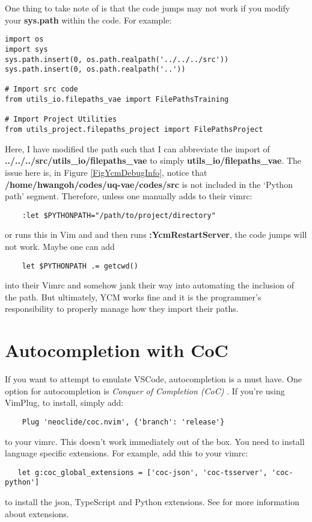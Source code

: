 One thing to take note of is that the code jumps may not work if you modify your
\textbf{sys.path} within the code. For example:
\begin{lstlisting}
import os
import sys
sys.path.insert(0, os.path.realpath('../../../src'))
sys.path.insert(0, os.path.realpath('..'))

# Import src code
from utils_io.filepaths_vae import FilePathsTraining

# Import Project Utilities
from utils_project.filepaths_project import FilePathsProject
\end{lstlisting}
Here, I have modified the path such that I can abbreviate the import of
\textbf{../../../src/utils\_io/filepaths\_vae} to simply
\textbf{utils\_io/filepaths\_vae}. The issue here is, in Figure
\ref{FigYcmDebugInfo}, notice that \textbf{/home/hwangoh/codes/uq-vae/codes/src}
is not included in the `Python path' segment. Therefore, unless one manually
adds to their vimrc:
\begin{lstlisting}
    :let $PYTHONPATH="/path/to/project/directory"
\end{lstlisting}
or runs this in Vim and and then runs \textbf{:YcmRestartServer}, the code jumps
will not work. Maybe one can add
\begin{lstlisting}
    let $PYTHONPATH .= getcwd()
\end{lstlisting}
into their Vimrc and somehow jank their way into automating the inclusion of the
path. But ultimately, YCM works fine and it is the programmer's responsibility
to properly manage how they import their paths.

\section{Autocompletion with CoC}
If you want to attempt to emulate VSCode, autocompletion is a must have. One
option for autocompletion is \emph{Conquer of Completion (CoC)}
\cite{neoclide2020conquer}. If you're using VimPlug, to install, simply add:
\begin{lstlisting}
    Plug 'neoclide/coc.nvim', {'branch': 'release'}
\end{lstlisting}
to your vimrc. This doesn't work immediately out of the box. You need to install
language specific extensions. For example, add this to your vimrc:
\begin{lstlisting}
   let g:coc_global_extensions = ['coc-json', 'coc-tsserver', 'coc-python']
\end{lstlisting}
to install the json, TypeScript and Python extensions. See
\cite{neoclide2020extensions} for more information about extensions.\\

